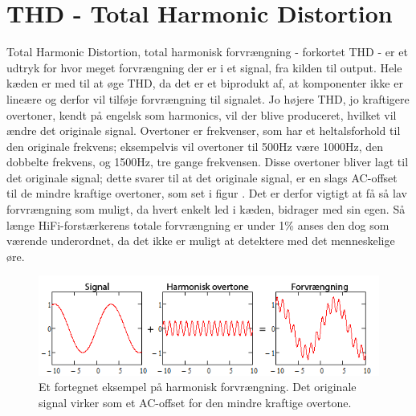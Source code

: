 \section{THD - Total Harmonic Distortion}
\label{thd}
Total Harmonic Distortion, total harmonisk forvrængning - forkortet THD - er et udtryk for hvor meget forvrængning der er i et signal, fra kilden til output.  Hele kæden er med til at øge THD, da det er et biprodukt af, at komponenter ikke er lineære og derfor vil tilføje forvrængning til signalet. Jo højere THD, jo kraftigere overtoner, kendt på engelsk som harmonics, vil der blive produceret, hvilket vil ændre det originale signal. Overtoner er frekvenser, som har et heltalsforhold til den originale frekvens; eksempelvis vil overtoner til 500Hz være 1000Hz, den dobbelte frekvens, og 1500Hz, tre gange frekvensen. Disse overtoner bliver lagt til det originale signal; dette svarer til at det originale signal, er en slags AC-offset til de mindre kraftige overtoner, som set i figur . Det er derfor vigtigt at få så lav forvrængning som muligt, da hvert enkelt led i kæden, bidrager med sin egen. Så længe HiFi-forstærkerens totale forvrængning er under 1\% anses den dog som værende underordnet, da det ikke er muligt at detektere med det menneskelige øre.

\begin{figure}[h]
\centering
\includegraphics[scale=.75]{indledende_analyse/thd/thd.png}
\caption{Et fortegnet eksempel på harmonisk forvrængning. Det originale signal virker som et AC-offset for den mindre kraftige overtone.}
\label{fig:harmonic_distortion}
\end{figure}
